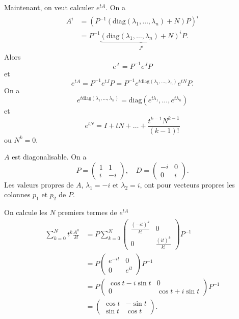 Maintenant, on veut calculer $e^{ tA }$. On a 
\begin{align*}
A^{i} & =(P^{-1}(\mathrm{diag}(\lambda_{1},\dots,\lambda _{n})+N)P)^{i} \\
 & =P^{-1}\underbrace{ (\mathrm{diag}(\lambda_{1},\dots,\lambda _{n})+N)^{i} }_{ J^{i} }P.
\end{align*}
Alors
$$
e^{ A }=P^{-1}e^{ J }P
$$
et 
$$
e^{ tA }=P^{-1}e^{ tJ }P=P^{-1}e^{ t\mathrm{diag}(\lambda_{1},\dots,\lambda _{n}) }e^{tN}P.
$$
On a
$$
e^{t\mathrm{diag}(\lambda_{1},\dots,\lambda _{n})}=\mathrm{diag}(e^{ t\lambda_{1} },\dots,e^{ t\lambda _{n} })
$$
et
$$
e^{ tN }=I + tN +\dots + \frac{t^{k-1}N^{k-1}}{(k-1)!}
$$
ou $N^{k}=0$.
\begin{example}
$A$ est diagonalisable. On a
$$
P=\begin{pmatrix}
1 & 1  \\
i & -i
\end{pmatrix}, \quad D=\begin{pmatrix}
-i & 0  \\
0 & i
\end{pmatrix}.
$$
Les valeurs propres de $A$, $\lambda_{1}=-i$ et $\lambda_{2}=i$, ont pour vecteurs propres les colonnes $p_{1}$ et $p_{2}$ de $P$. 

On calcule les $N$ premiers termes de $e^{ tA }$ 
\begin{align*}
\sum_{k=0}^{N} t^{k} \frac{A^{k}}{k!} & =P \sum_{k=0}^{N} \begin{pmatrix} \frac{(-it)^{k}}{k!} & 0 \\
0 & \frac{(it)^{k}}{k!}
\end{pmatrix}P^{-1} \\
 & = P\begin{pmatrix}
e^{ -it } & 0 \\
0 & e^{ it }
\end{pmatrix}P^{-1} \\
 & =P\begin{pmatrix}
\cos t-i\sin t & 0 \\
0 & \cos t+i\sin t 
\end{pmatrix}P^{-1} \\
 & =\begin{pmatrix}
\cos t & -\sin t \\
\sin t & \cos t
\end{pmatrix}.
\end{align*}
\end{example}

